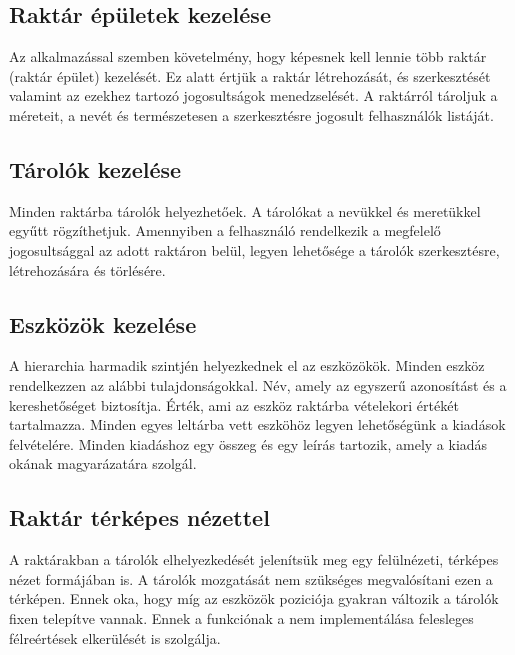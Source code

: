 \subsection{Raktár épületek kezelése}
Az alkalmazással szemben követelmény, hogy képesnek kell lennie több raktár (raktár épület) kezelését.
Ez alatt értjük a raktár létrehozását, és szerkesztését valamint az ezekhez tartozó jogosultságok menedzselését.
A raktárról tároljuk a méreteit, a nevét és természetesen a szerkesztésre jogosult felhasználók listáját.

\subsection{Tárolók kezelése}
Minden raktárba tárolók helyezhetőek. A tárolókat a nevükkel és meretükkel egyűtt rögzíthetjuk.
Amennyiben a felhasználó rendelkezik a megfelelő jogosultsággal az adott raktáron belül, legyen lehetősége a tárolók szerkesztésre, létrehozására és törlésére.

\subsection{Eszközök kezelése}
A hierarchia harmadik szintjén helyezkednek el az eszközökök. 
Minden eszköz rendelkezzen az alábbi tulajdonságokkal.
Név, amely az egyszerű azonosítást és a kereshetőséget biztosítja.
Érték, ami az eszköz raktárba vételekori értékét tartalmazza.
Minden egyes leltárba vett eszköhöz legyen lehetőségünk a kiadások felvételére.
Minden kiadáshoz egy összeg és egy leírás tartozik, amely a kiadás okának magyarázatára szolgál.

\subsection{Raktár térképes nézettel}
A raktárakban a tárolók elhelyezkedését jelenítsük meg egy felülnézeti, térképes nézet formájában is.
A tárolók mozgatását nem szükséges megvalósítani ezen a térképen.
Ennek oka, hogy míg az eszközök poziciója gyakran változik a tárolók fixen telepítve vannak.
Ennek a funkciónak a nem implementálása felesleges félreértések elkerülését is szolgálja.

